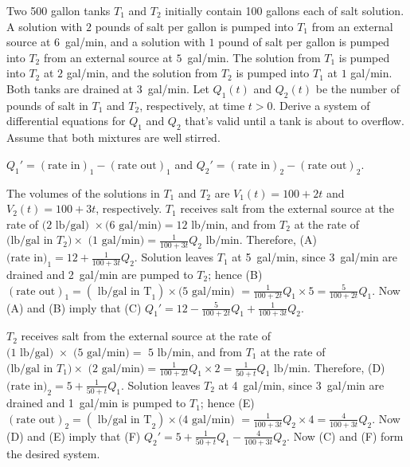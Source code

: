 \documentclass{ximera}
\begin{document}
\begin{problem}\label{exer:10.1.2}
Two 500 gallon tanks $T_1$ and $T_2$ initially contain 100
gallons each of salt solution. A solution with $2$ pounds of salt per
gallon is pumped into $T_1$ from an external source at $6$~gal/min, and
a solution with $1$ pound of salt per gallon is pumped into $T_2$ from
an external source at $5$~gal/min. The solution from $T_1$ is pumped
into $T_2$ at $2$ gal/min, and the solution from $T_2$ is pumped into
$T_1$ at $1$ gal/min. Both tanks are drained at $3$~gal/min. Let $Q_1(t)$
and $Q_2(t)$ be the number of pounds of salt in $T_1$ and $T_2$,
respectively, at time $t>0$. Derive a system of differential equations
for $Q_1$ and $Q_2$ that's valid until a tank is about to overflow.
Assume that both mixtures are well stirred.

\begin{solution}
    $Q_1'=(\mbox{rate in})_1-(\mbox{rate out})_1$ and $Q_2'=(\mbox{rate
in})_2-(\mbox{rate out})_2$.

The volumes of the solutions in $T_1$ and $T_2$ are $V_1(t)=100+2t$
and $V_2(t)=100+3t$, respectively. $T_1$ receives salt from the
external source at the rate of $\mbox{(2 lb/gal) }\times\mbox{
(6~gal/min)}=\mbox{12 lb/min}$, and from $T_2$ at the rate of
$\mbox{(lb/gal in }T_2)\times\mbox{ (1~gal/min)
}=\frac{1}{100+3t}Q_2 \mbox{ lb/min}$. Therefore, (A) $\mbox{(rate
in)}_1= 12+\frac{1}{100+3t}Q_2$. Solution leaves $T_1$ at 5~gal/min,
since 3~gal/min are drained and 2~gal/min are pumped to $T_2$; hence
(B) $(\mbox{rate out})_1=(\mbox{ lb/gal in T}_1)\times
\mbox{(5~gal/min) }
=\frac{1}{100+2t}Q_1\times5=\frac{5}{100+2t}Q_1$. Now (A) and (B)
imply that (C) $Q_1'=12-\frac{5}{100+2t}Q_1+\frac{1}{100+3t}Q_2$.

$T_2$ receives salt from the external source at the rate of $\mbox{(1
lb/gal) }\times\mbox{ (5~gal/min)}=\mbox{ 5 lb/min}$, and from $T_1$
at the rate of $\mbox{(lb/gal in }T_1)\times\mbox{ (2~gal/min)
}=\frac{1}{100+2t}Q_1\times2=\frac{1}{50+t}Q_1 \mbox{ lb/min}$.
Therefore, (D) $\mbox{(rate in)}_2= 5+\frac{1}{50+t}Q_1$. Solution
leaves $T_2$ at 4~gal/min, since 3~gal/min are drained and 1~gal/min
is pumped to $T_1$; hence (E) $(\mbox{rate out})_2=(\mbox{ lb/gal in
T}_2)\times \mbox{(4~gal/min) }
=\frac{1}{100+3t}Q_2\times4=\frac{4}{100+3t}Q_2$. Now (D) and (E)
imply that (F) $Q_2'=5+\frac{1}{50+t}Q_1-\frac{4}{100+3t}Q_2$. Now
(C) and (F) form the desired system.
\end{solution}
\end{problem}
\end{document}
